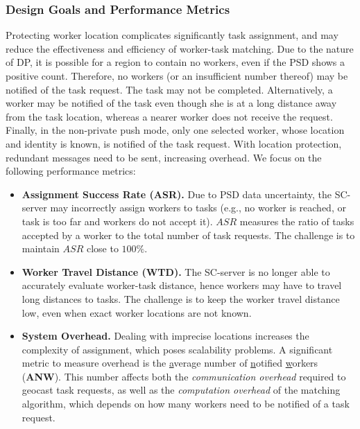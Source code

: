 \documentclass{USC-Thesis}
\renewcommand\bf\bfseries  %
\numberwithin{equation}{chapter}
\begin{document}
\subsubsection{Design Goals and Performance Metrics}
\label{sec:metrics1}
Protecting worker location complicates significantly task assignment, and may reduce the effectiveness and efficiency of worker-task matching. Due to the nature of DP, it is possible for a region to contain no workers, even if the PSD shows a positive count. Therefore, no workers (or an insufficient number thereof) may be notified of the task request. The task may not be completed. Alternatively, a worker may be notified of the task even though she is at a long distance away from the task location, whereas a nearer worker does not receive the request. 
Finally, in the non-private push mode, only one selected worker, whose location and identity is known, is notified of the task request. 
With location protection, redundant messages need to be sent, increasing overhead.
We focus on the following performance metrics:
\begin{itemize}
\item
{\bf Assignment Success Rate (ASR).} Due to PSD data uncertainty, the SC-server may incorrectly assign workers to tasks (e.g., no worker is reached, or task is too far and workers do not accept it). $\mathit{ASR}$ measures the ratio of tasks accepted by a worker
to the total number of task requests. The challenge is to maintain $\mathit{ASR}$ close to $100\%$.
\item
{\bf Worker Travel Distance (WTD).} The SC-server is no longer able to accurately evaluate worker-task distance, hence workers may have to travel long distances to tasks. The challenge is to keep the worker travel distance low, even when exact worker locations are not known.
\item
{\bf System Overhead.} Dealing with imprecise locations increases the complexity of assignment, which poses scalability problems. 
A significant metric to measure overhead is the {\underline a}verage number of {\underline n}otified {\underline w}orkers ({\bf ANW}).
This number affects both the {\em communication overhead} required to geocast task requests, as well as the {\em computation overhead} of the matching algorithm, which depends on how many workers need to be notified of a task request.
\end{itemize}
\end{document}
